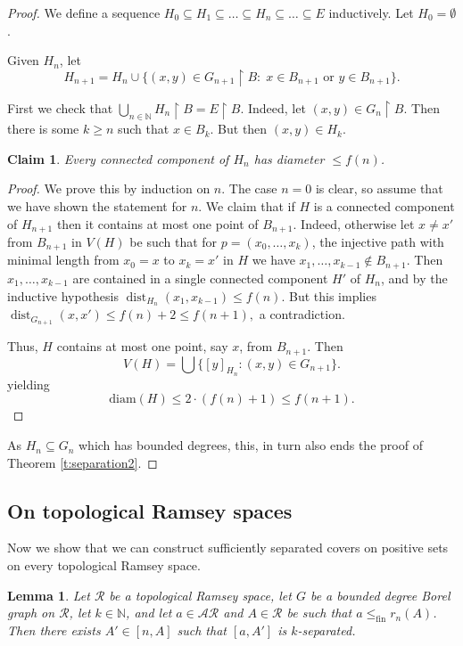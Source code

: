 \documentclass[11pt]{amsart}
\newcommand{\N}{\mathbb{N}}
\renewcommand{\restriction}[2]{#1 \upharpoonright #2}
\newtheorem{lemma}[theorem]{Lemma}
\newtheorem{claim}[theorem]{Claim}
\theoremstyle{definition}
\numberwithin{equation}{section}
\DeclareMathOperator{\dist}{dist}
\newcommand{\rstr}{\restriction}
\newcommand{\sse}{\subseteq}
\newcommand{\fA}{\mathcal{A}}
\newcommand{\fR}{\mathcal{R}}
\begin{document}
	\begin{proof}
		
		We define a sequence $H_0 \subseteq H_1 \subseteq \dots \subseteq H_n \subseteq \dots \subseteq E$ inductively. Let $H_0=\emptyset$. 
		
		Given $H_n$, let \[H_{n+1}=H_{n} \cup \{(x,y) \in \restriction{G_{n+1}}{B}:\; x\in B_{n+1} \text{ or } y\in B_{n+1}\}.\]
		
		First we check that $\rstr{\bigcup_{n \in \N} H_n}{B}=\restriction{E}{B}$. Indeed, let $(x,y) \in \rstr{G_n}{B}$. Then there is some $k \geq n$ such that $x \in B_k$. But then $(x,y) \in H_k$. 
		
		\begin{claim}
			Every connected component of $H_n$ has diameter $\le f(n)$. 
			
		\end{claim}
		\begin{proof}
			We prove this by induction on $n$. The case $n=0$ is clear, so assume that we have shown the statement for $n$. We claim that if $H$ is a connected component of $H_{n+1}$ then it contains at most one point of $B_{n+1}$. Indeed, otherwise let $x \neq x' $ from $B_{n+1}$ in $V(H)$ be such that for $p=(x_0,\dots,x_k)$, the injective path with minimal length from $x_0=x$ to $x_k=x'$ in $H$ we have $x_1,\ldots,x_{k-1}\notin B_{n+1}$. Then $x_1,\ldots,x_{k-1}$ are contained in a single connected component $H'$ of $H_n$, and by the inductive hypothesis $\dist_{H_n}(x_1,x_{k-1})\le f(n).$ But this implies $\dist_{G_{n+1}}(x,x')\le f(n)+2\le f(n+1),$ a contradiction.
			
			Thus, $H$ contains at most one point, say $x$, from $B_{n+1}$. Then \[V(H)=\bigcup \{[y]_{H_{n}}:(x,y) \in G_{n+1}\}.\]
			yielding \[\text{diam}(H) \le 2\cdot (f(n)+1) \le f(n+1).\]
		\end{proof}
		
		As $H_n\sse G_n$ which has bounded degrees, this, in turn also ends the proof of Theorem \ref{t:separation2}.
	\end{proof}
	
	\subsection{On topological Ramsey spaces}
	\label{s:topram}
	Now we show that we can construct sufficiently separated covers on positive sets on every topological Ramsey space. 
	
	
	
	\begin{lemma}
		\label{l:graph canonization}
		Let $\fR$ be a topological Ramsey space, let $G$ be a bounded degree Borel graph on $\fR$, let $k\in \N$, and let $a\in \fA\fR$ and $A\in\fR$ be such that $a\le_{\text{fin}}r_n(A)$. Then there exists $A'\in [n,A]$ such that $[a,A']$ is $k$-separated.
	\end{lemma}
	
\end{document}
